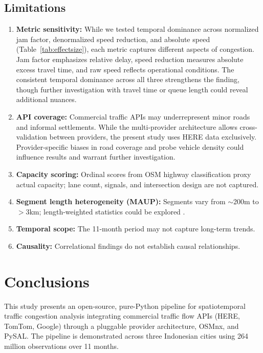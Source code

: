 \documentclass[preprint,12pt,authoryear]{elsarticle}
\begin{document}
\subsection{Limitations}

\begin{enumerate}
\item \textbf{Metric sensitivity:} While we tested temporal dominance across normalized jam factor, denormalized speed reduction, and absolute speed (Table~\ref{tab:effectsize}), each metric captures different aspects of congestion. Jam factor emphasizes relative delay, speed reduction measures absolute excess travel time, and raw speed reflects operational conditions. The consistent temporal dominance across all three strengthens the finding, though further investigation with travel time or queue length could reveal additional nuances.
\item \textbf{API coverage:} Commercial traffic APIs may underrepresent minor roads and informal settlements. While the multi-provider architecture allows cross-validation between providers, the present study uses HERE data exclusively. Provider-specific biases in road coverage and probe vehicle density could influence results and warrant further investigation.
\item \textbf{Capacity scoring:} Ordinal scores from OSM highway classification proxy actual capacity; lane count, signals, and intersection design are not captured.
\item \textbf{Segment length heterogeneity (MAUP):} Segments vary from $\sim$200m to $>$3km; length-weighted statistics could be explored \citep{Openshaw1984}.
\item \textbf{Temporal scope:} The 11-month period may not capture long-term trends.
\item \textbf{Causality:} Correlational findings do not establish causal relationships.
\end{enumerate}


\section{Conclusions}
\label{sec:conclusions}

This study presents an open-source, pure-Python pipeline for spatiotemporal traffic congestion analysis integrating commercial traffic flow APIs (HERE, TomTom, Google) through a pluggable provider architecture, OSMnx, and PySAL. The pipeline is demonstrated across three Indonesian cities using 264 million observations over 11 months.
\end{document}
